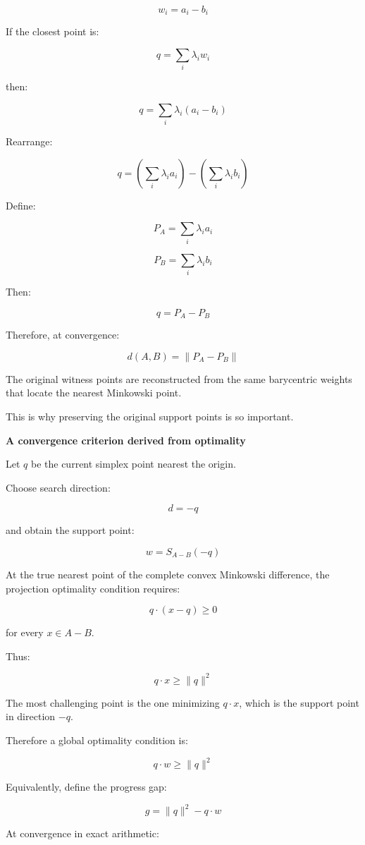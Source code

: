 \[
w_i=a_i-b_i
\]

If the closest point is:

\[
q=\sum_i\lambda_iw_i
\]

then:

\[
q= \sum_i\lambda_i(a_i-b_i)
\]

Rearrange:

\[
q= \left(\sum_i\lambda_ia_i\right) - \left(\sum_i\lambda_ib_i\right)
\]

Define:

\[
\boxed{ P_A=\sum_i\lambda_ia_i }
\]

\[
\boxed{ P_B=\sum_i\lambda_ib_i }
\]

Then:

\[
\boxed{ q=P_A-P_B }
\]

Therefore, at convergence:

\[
\boxed{ d(A,B)=\|P_A-P_B\| }
\]

The original witness points are reconstructed from the same barycentric weights that locate the nearest Minkowski point.

This is why preserving the original support points is so important.

\textbf{A convergence criterion derived from optimality}

Let \(q\) be the current simplex point nearest the origin.

Choose search direction:

\[
d=-q
\]

and obtain the support point:

\[
w=S_{A-B}(-q)
\]

At the true nearest point of the complete convex Minkowski difference, the projection optimality condition requires:

\[
q\cdot(x-q)\ge0
\]

for every \(x\in A-B\).

Thus:

\[
q\cdot x\ge\|q\|^2
\]

The most challenging point is the one minimizing \(q\cdot x\), which is the support point in direction \(-q\).

Therefore a global optimality condition is:

\[
\boxed{ q\cdot w\ge\|q\|^2 }
\]

Equivalently, define the progress gap:

\[
\boxed{ g=\|q\|^2-q\cdot w }
\]

At convergence in exact arithmetic:

